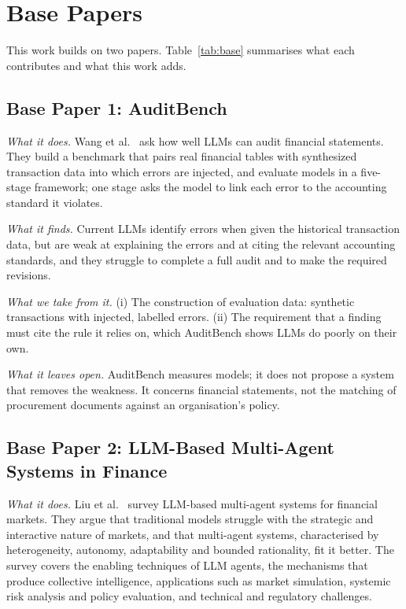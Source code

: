 \documentclass[conference]{IEEEtran}
\begin{document}
\section{Base Papers}
\label{sec:base}
This work builds on two papers. Table~\ref{tab:base} summarises what each contributes and what this work adds.

\subsection{Base Paper 1: AuditBench}
\textit{What it does.} Wang et al.~\cite{wang2025auditbench} ask how well LLMs can audit financial statements. They build a benchmark that pairs real financial tables with synthesized transaction data into which errors are injected, and evaluate models in a five-stage framework; one stage asks the model to link each error to the accounting standard it violates.

\textit{What it finds.} Current LLMs identify errors when given the historical transaction data, but are weak at explaining the errors and at citing the relevant accounting standards, and they struggle to complete a full audit and to make the required revisions.

\textit{What we take from it.} (i) The construction of evaluation data: synthetic transactions with injected, labelled errors. (ii) The requirement that a finding must cite the rule it relies on, which AuditBench shows LLMs do poorly on their own.

\textit{What it leaves open.} AuditBench measures models; it does not propose a system that removes the weakness. It concerns financial statements, not the matching of procurement documents against an organisation's policy.

\subsection{Base Paper 2: LLM-Based Multi-Agent Systems in Finance}
\textit{What it does.} Liu et al.~\cite{liu2026survey} survey LLM-based multi-agent systems for financial markets. They argue that traditional models struggle with the strategic and interactive nature of markets, and that multi-agent systems, characterised by heterogeneity, autonomy, adaptability and bounded rationality, fit it better. The survey covers the enabling techniques of LLM agents, the mechanisms that produce collective intelligence, applications such as market simulation, systemic risk analysis and policy evaluation, and technical and regulatory challenges.
\end{document}
